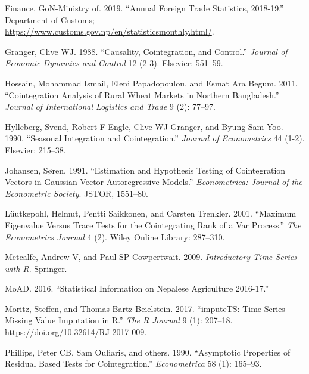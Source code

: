 \documentclass[12pt,]{article}
\begin{document}
\leavevmode\hypertarget{ref-GoNMoFDoC1819}{}%
Finance, GoN-Ministry of. 2019. ``Annual Foreign Trade Statistics, 2018-19.'' Department of Customs; \url{https://www.customs.gov.np/en/statisticsmonthly.html/}.

\leavevmode\hypertarget{ref-granger1988causality}{}%
Granger, Clive WJ. 1988. ``Causality, Cointegration, and Control.'' \emph{Journal of Economic Dynamics and Control} 12 (2-3). Elsevier: 551--59.

\leavevmode\hypertarget{ref-hossain2011cointegration}{}%
Hossain, Mohammad Ismail, Eleni Papadopoulou, and Esmat Ara Begum. 2011. ``Cointegration Analysis of Rural Wheat Markets in Northern Bangladesh.'' \emph{Journal of International Logistics and Trade} 9 (2): 77--97.

\leavevmode\hypertarget{ref-hylleberg1990seasonal}{}%
Hylleberg, Svend, Robert F Engle, Clive WJ Granger, and Byung Sam Yoo. 1990. ``Seasonal Integration and Cointegration.'' \emph{Journal of Econometrics} 44 (1-2). Elsevier: 215--38.

\leavevmode\hypertarget{ref-johansen1991estimation}{}%
Johansen, Søren. 1991. ``Estimation and Hypothesis Testing of Cointegration Vectors in Gaussian Vector Autoregressive Models.'' \emph{Econometrica: Journal of the Econometric Society}. JSTOR, 1551--80.

\leavevmode\hypertarget{ref-luutkepohl2001maximum}{}%
Lüutkepohl, Helmut, Pentti Saikkonen, and Carsten Trenkler. 2001. ``Maximum Eigenvalue Versus Trace Tests for the Cointegrating Rank of a Var Process.'' \emph{The Econometrics Journal} 4 (2). Wiley Online Library: 287--310.

\leavevmode\hypertarget{ref-metcalfe2009introductory}{}%
Metcalfe, Andrew V, and Paul SP Cowpertwait. 2009. \emph{Introductory Time Series with R}. Springer.

\leavevmode\hypertarget{ref-moad2016statistical}{}%
MoAD. 2016. ``Statistical Information on Nepalese Agriculture 2016-17.''

\leavevmode\hypertarget{ref-tsmissingvalueimpute2017}{}%
Moritz, Steffen, and Thomas Bartz-Beielstein. 2017. ``imputeTS: Time Series Missing Value Imputation in R.'' \emph{The R Journal} 9 (1): 207--18. \url{https://doi.org/10.32614/RJ-2017-009}.

\leavevmode\hypertarget{ref-phillips1990asymptotic}{}%
Phillips, Peter CB, Sam Ouliaris, and others. 1990. ``Asymptotic Properties of Residual Based Tests for Cointegration.'' \emph{Econometrica} 58 (1): 165--93.
\end{document}
